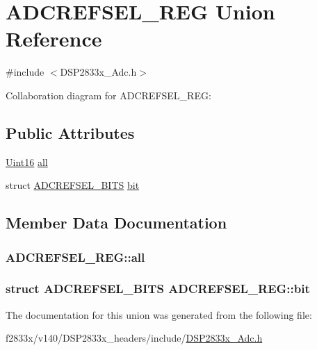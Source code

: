 \hypertarget{union_a_d_c_r_e_f_s_e_l___r_e_g}{}\section{A\+D\+C\+R\+E\+F\+S\+E\+L\+\_\+\+R\+E\+G Union Reference}
\label{union_a_d_c_r_e_f_s_e_l___r_e_g}


{\ttfamily \#include $<$D\+S\+P2833x\+\_\+\+Adc.\+h$>$}



Collaboration diagram for A\+D\+C\+R\+E\+F\+S\+E\+L\+\_\+\+R\+E\+G\+:
\subsection*{Public Attributes}
\begin{DoxyCompactItemize}
\item 
\hyperlink{_d_s_p2833x___device_8h_a59a9f6be4562c327cbfb4f7e8e18f08b}{Uint16} \hyperlink{union_a_d_c_r_e_f_s_e_l___r_e_g_ae025e349cf580a21a086f9251252f861}{all}
\item 
struct \hyperlink{struct_a_d_c_r_e_f_s_e_l___b_i_t_s}{A\+D\+C\+R\+E\+F\+S\+E\+L\+\_\+\+B\+I\+T\+S} \hyperlink{union_a_d_c_r_e_f_s_e_l___r_e_g_a9c29ea3af69aacba2e7a430e98eeadf4}{bit}
\end{DoxyCompactItemize}


\subsection{Member Data Documentation}
\hypertarget{union_a_d_c_r_e_f_s_e_l___r_e_g_ae025e349cf580a21a086f9251252f861}{}
\subsubsection[{all}]{ A\+D\+C\+R\+E\+F\+S\+E\+L\+\_\+\+R\+E\+G\+::all}\label{union_a_d_c_r_e_f_s_e_l___r_e_g_ae025e349cf580a21a086f9251252f861}
\hypertarget{union_a_d_c_r_e_f_s_e_l___r_e_g_a9c29ea3af69aacba2e7a430e98eeadf4}{}
\subsubsection[{bit}]{\setlength{\rightskip}{0pt plus 5cm}struct {\bf A\+D\+C\+R\+E\+F\+S\+E\+L\+\_\+\+B\+I\+T\+S} A\+D\+C\+R\+E\+F\+S\+E\+L\+\_\+\+R\+E\+G\+::bit}\label{union_a_d_c_r_e_f_s_e_l___r_e_g_a9c29ea3af69aacba2e7a430e98eeadf4}


The documentation for this union was generated from the following file\+:\begin{DoxyCompactItemize}
\item 
f2833x/v140/\+D\+S\+P2833x\+\_\+headers/include/\hyperlink{_d_s_p2833x___adc_8h}{D\+S\+P2833x\+\_\+\+Adc.\+h}\end{DoxyCompactItemize}
